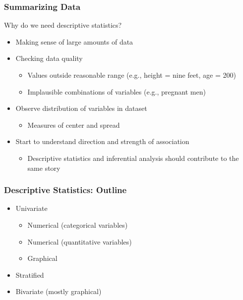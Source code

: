 \documentclass[12pt, 
hyperref={colorlinks=true, linkcolor=blue, urlcolor=cyan}]{beamer}
\begin{document}
\begin{frame}
\frametitle{Summarizing Data}

Why do we need descriptive statistics?\vspace{-0.2cm}
\begin{itemize}
\item Making sense of large amounts of data
\item Checking data quality
	\begin{itemize}
	\item Values outside reasonable range (e.g., height = nine feet, age = 200)
	\item Implausible combinations of variables (e.g., pregnant men)
	\end{itemize}
\item Observe distribution of variables in dataset
	\begin{itemize}
	\item Measures of center and spread
	\end{itemize}
\item Start to understand direction and strength of association
	\begin{itemize}
	\item Descriptive statistics and inferential analysis should contribute to the same story
	\end{itemize}
\end{itemize}

\end{frame}

\begin{frame}
\frametitle{Descriptive Statistics: Outline}

\begin{itemize}
\item Univariate
	\begin{itemize}
	\item Numerical (categorical variables)
	\item Numerical (quantitative variables)
	\item Graphical
	\end{itemize}
\item Stratified
\item Bivariate (mostly graphical)
\end{itemize}

\end{frame}
\end{document}
